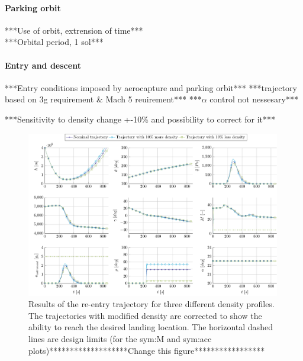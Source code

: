 \paragraph{Parking orbit}
***Use of orbit, extrension of time***\\
***Orbital period, 1 sol***\\

\paragraph{Entry and descent}
***Entry conditions imposed by aerocapture and parking orbit***
***trajectory based on 3g requirement \& Mach 5 reuirement***
***$\alpha$ control not nessesary***

***Sensitivity to density change +-10\% and possibility to correct for it***\\
\begin{figure}
	\centering
	\includegraphics[width=0.99\textwidth]{Figure/Orbit/sensitivity_aerocapture.pdf}
	\caption{Results of the re-entry trajectory for three different density profiles. The trajectories with modified density are corrected to show the ability to reach the desired landing location. The horizontal dashed lines are design limits (for the \gls{sym:M} and \gls{sym:acc} plots)*******************Change this figure***************** }
	\label{fig:orbit_entry_data}
\end{figure}